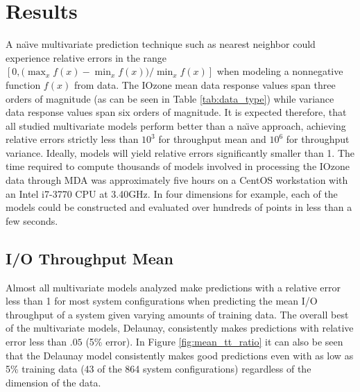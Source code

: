 \documentclass{scspaperproc}
\theoremstyle{scsthe}
\begin{document}
\section{Results}
\label{sec:results}

A na\"{\i}ve multivariate prediction technique such as nearest
neighbor could experience relative errors in the range $\displaystyle
[0, \big(\max_x f(x) - \min_x f(x)\big) / \min_x f(x) ]$ when modeling
a nonnegative function $f(x)$ from data. The IOzone mean data response
values span three orders of magnitude (as can be seen in Table
\ref{tab:data_type}) while variance data response values span six
orders of magnitude. It is expected therefore, that all studied
multivariate models perform better than a na\"{\i}ve approach,
achieving relative errors strictly less than $10^3$ for throughput
mean and $10^6$ for throughput variance. Ideally, models will yield
relative errors significantly smaller than 1. The time required to
compute thousands of models involved in processing the IOzone data
through MDA was approximately five hours on a CentOS workstation with
an Intel i7-3770 CPU at 3.40GHz. In four dimensions for example, each
of the models could be constructed and evaluated over hundreds of
points in less than a few seconds.

\vspace{-10pt}
\subsection{I/O Throughput Mean}
\vspace{-10pt}
Almost all multivariate models analyzed make predictions with a
relative error less than 1 for most system configurations when
predicting the mean I/O throughput of a system given varying amounts
of training data. The overall best of the multivariate models,
Delaunay, consistently makes predictions with relative error less than
$.05$ (5\% error). In Figure \ref{fig:mean_tt_ratio} it can also be
seen that the Delaunay model consistently makes good predictions even
with as low as 5\% training data (43 of the 864 system configurations)
regardless of the dimension of the data.
\end{document}
